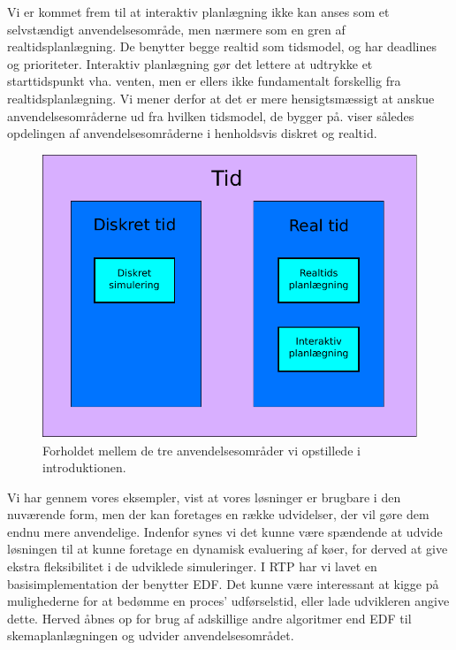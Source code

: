 Vi er kommet frem til at interaktiv planlægning ikke kan anses som et selvstændigt anvendelsesområde, men nærmere som en gren af realtidsplanlægning. De benytter begge realtid som tidsmodel, og har deadlines og prioriteter. Interaktiv planlægning gør det lettere at udtrykke et starttidspunkt vha. venten, men er ellers ikke fundamentalt forskellig fra realtidsplanlægning. Vi mener derfor at det er mere hensigtsmæssigt at anskue anvendelsesområderne ud fra hvilken tidsmodel, de bygger på.  viser således opdelingen af anvendelsesområderne i henholdsvis diskret og realtid.

\begin{figure}[htp]
 \begin{center}
  \includegraphics[scale=0.6]{images/timemodel}
	\caption{Forholdet mellem de tre anvendelsesområder vi opstillede i introduktionen.}
	\label{fig:timemodel}
\end{center}
\end{figure}


Vi har gennem vores eksempler, vist at vores løsninger er brugbare i den nuværende form, men der kan foretages en række udvidelser, der vil gøre dem endnu mere anvendelige. 
Indenfor \des synes vi det kunne være spændende at udvide løsningen til at kunne foretage en dynamisk evaluering af køer, for derved at give ekstra fleksibilitet i de udviklede simuleringer. I RTP har vi lavet en basisimplementation der benytter EDF. Det kunne være interessant at kigge på mulighederne for at bedømme en proces' udførselstid, eller lade udvikleren angive dette.  Herved åbnes op for brug af adskillige andre algoritmer end EDF til skemaplanlægningen og udvider anvendelsesområdet.  







